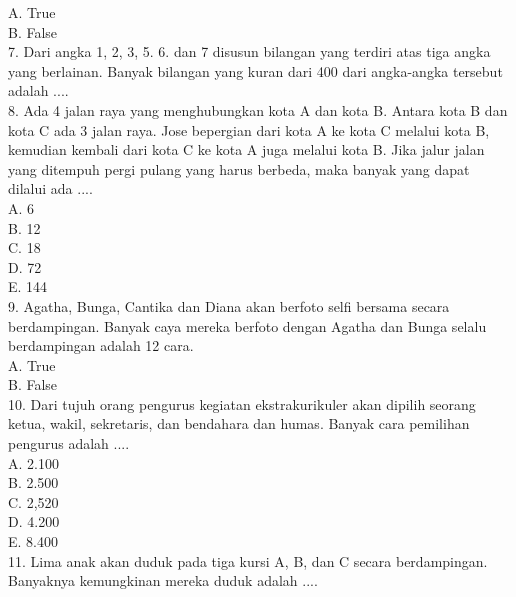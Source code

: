 \documentclass[11pt,fleqn]{book} %
\begin{document}
A. 
True\\

B. 
False\\

7. 
Dari angka 1, 2, 3, 5. 6. dan 7 disusun bilangan yang terdiri atas tiga angka yang berlainan. Banyak bilangan yang kuran dari 400 dari angka-angka tersebut adalah ....\\

8. 
Ada 4 jalan raya yang menghubungkan kota A dan kota B. Antara kota B dan kota C ada 3 jalan raya. Jose bepergian dari kota A ke kota C melalui kota B, kemudian kembali dari kota C ke kota A juga melalui kota B. Jika jalur jalan yang ditempuh pergi pulang yang harus berbeda, maka banyak yang dapat dilalui ada ....\\

A. 
6\\

B. 
12\\

C. 
18\\

D. 
72\\

E. 
144\\

9. 
Agatha, Bunga, Cantika dan Diana akan berfoto selfi bersama secara berdampingan. Banyak caya mereka berfoto dengan Agatha dan Bunga selalu berdampingan adalah 12 cara.\\

A. 
True\\

B. 
False\\

10. 
Dari tujuh orang pengurus kegiatan ekstrakurikuler akan dipilih seorang ketua, wakil, sekretaris, dan bendahara dan humas. Banyak cara pemilihan pengurus adalah ....\\

A. 
2.100\\

B. 
2.500\\

C. 
2,520\\

D. 
4.200\\

E. 
8.400\\

11. 
Lima anak akan duduk pada tiga kursi A, B, dan C secara berdampingan. Banyaknya kemungkinan mereka duduk adalah 
....\\
\end{document}
